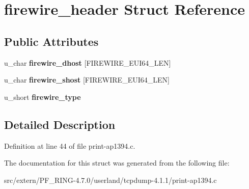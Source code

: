 \hypertarget{structfirewire__header}{
\section{firewire\_\-header Struct Reference}
\label{structfirewire__header}
}
\subsection*{Public Attributes}
\begin{DoxyCompactItemize}
\item 
\hypertarget{structfirewire__header_ad1c50c3fccccd1efbf1b54c1b965d423}{
u\_\-char {\bfseries firewire\_\-dhost} \mbox{[}FIREWIRE\_\-EUI64\_\-LEN\mbox{]}}
\label{structfirewire__header_ad1c50c3fccccd1efbf1b54c1b965d423}

\item 
\hypertarget{structfirewire__header_ae8c2d69a8f6732e09de2459818f8f566}{
u\_\-char {\bfseries firewire\_\-shost} \mbox{[}FIREWIRE\_\-EUI64\_\-LEN\mbox{]}}
\label{structfirewire__header_ae8c2d69a8f6732e09de2459818f8f566}

\item 
\hypertarget{structfirewire__header_a81016cb7863e5cabaa30f5efcd703494}{
u\_\-short {\bfseries firewire\_\-type}}
\label{structfirewire__header_a81016cb7863e5cabaa30f5efcd703494}

\end{DoxyCompactItemize}


\subsection{Detailed Description}


Definition at line 44 of file print-\/ap1394.c.



The documentation for this struct was generated from the following file:\begin{DoxyCompactItemize}
\item 
src/extern/PF\_\-RING-\/4.7.0/userland/tcpdump-\/4.1.1/print-\/ap1394.c\end{DoxyCompactItemize}
